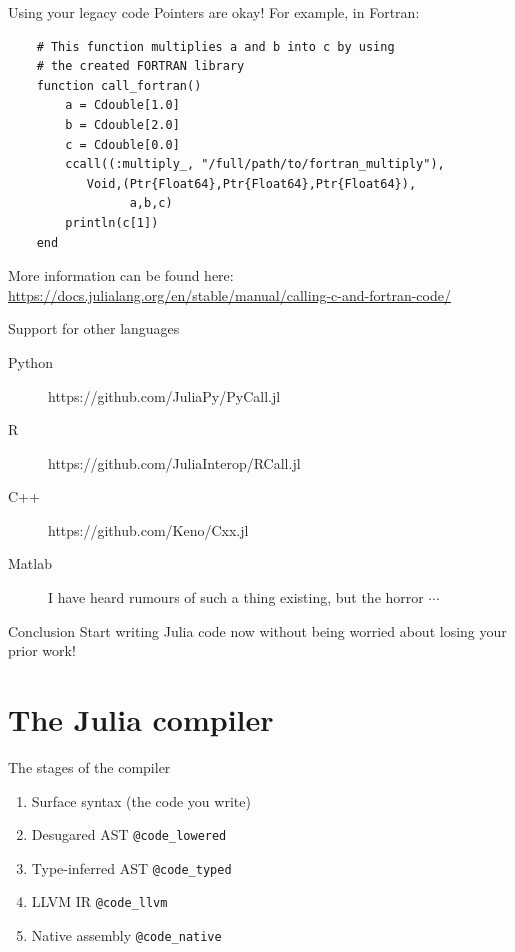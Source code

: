 \documentclass{beamer}
\begin{document}
\begin{frame}[fragile]{Using your legacy code}
Pointers are okay! For example, in Fortran:

\begin{lstlisting}
    # This function multiplies a and b into c by using 
    # the created FORTRAN library
    function call_fortran()
        a = Cdouble[1.0]
        b = Cdouble[2.0]
        c = Cdouble[0.0]
        ccall((:multiply_, "/full/path/to/fortran_multiply"),
           Void,(Ptr{Float64},Ptr{Float64},Ptr{Float64}),
                 a,b,c)
        println(c[1])
    end
\end{lstlisting}

\pause
More information can be found here: \url{https://docs.julialang.org/en/stable/manual/calling-c-and-fortran-code/}
\end{frame}
\begin{frame}{Support for other languages}
  \begin{description}
    \item[Python] https://github.com/JuliaPy/PyCall.jl
    \item[R] https://github.com/JuliaInterop/RCall.jl
    \item[C++] https://github.com/Keno/Cxx.jl
    \item[Matlab] I have heard rumours of such a thing existing, but the horror $\cdots$
  \end{description}
  \begin{block}{Conclusion}
    Start writing Julia code now without being worried about losing your prior work!
  \end{block}
\end{frame}

\section{The Julia compiler}
\begin{frame}[fragile]{The stages of the compiler}
  \begin{enumerate}
    \item Surface syntax (the code you write)
    \item Desugared AST \lstinline{@code_lowered}
    \item Type-inferred AST \lstinline{@code_typed}
    \item LLVM IR \lstinline{@code_llvm}
    \item Native assembly \lstinline{@code_native}
  \end{enumerate}
\end{frame}
\end{document}

